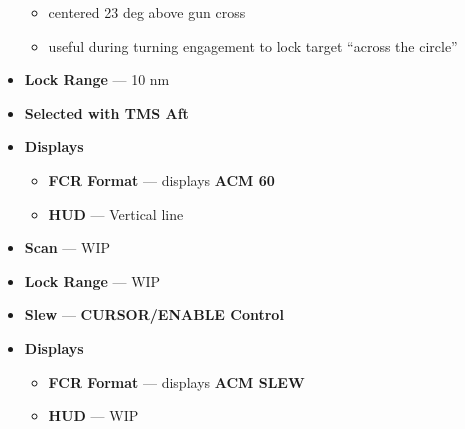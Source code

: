 \begin{tcoloritemize}
\begin{itemize}
\begin{itemize}
            \item centered 23 deg above gun cross
            \item useful during turning engagement to lock target ``across the circle''
        \end{itemize}
        \item \textbf{Lock Range} --- 10 nm
        \item \textbf{Selected with TMS Aft}
        \item \textbf{Displays}
        \begin{itemize}
            \item \textbf{FCR Format} --- displays \textbf{ACM 60}
            \item \textbf{HUD} --- Vertical line
        \end{itemize}
    \end{itemize}
    \begin{itemize}
        \item \textbf{Scan} --- WIP
        \item \textbf{Lock Range} --- WIP
        \item \textbf{Slew} --- \textbf{CURSOR/ENABLE Control}
        \item \textbf{Displays}
        \begin{itemize}
            \item \textbf{FCR Format} --- displays \textbf{ACM SLEW}
            \item \textbf{HUD} --- WIP
        \end{itemize}
    \end{itemize}
\end{tcoloritemize}

\marginfigeometry

